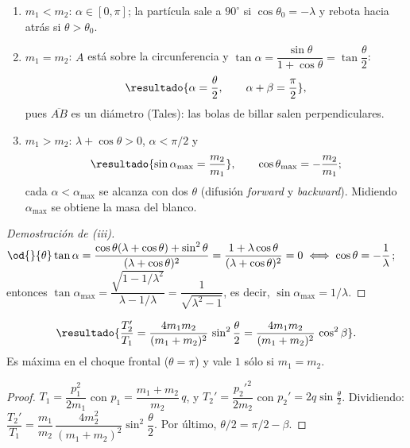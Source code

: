 \begin{corolario}
\label{cor:casos}
\begin{enumerate}[label=\textup{(\roman*)},leftmargin=2em]
  \item $m_{1}<m_{2}$: $\alpha\in[0,\pi]$; la partícula sale a $90^{\circ}$ si
        $\cos\theta_{0}=-\lambda$ y rebota hacia atrás si $\theta>\theta_{0}$.
  \item $m_{1}=m_{2}$: $A$ está sobre la circunferencia y $\tan\alpha=\dfrac{\sin\theta}{1+\cos\theta}=\tan\dfrac\theta2$:
        \[
          \resultado{\alpha=\frac\theta2,\qquad \alpha+\beta=\frac\pi2},
        \]
        pues $\overline{AB}$ es un diámetro (Tales): las bolas de billar salen perpendiculares.
  \item $m_{1}>m_{2}$: $\lambda+\cos\theta>0$, $\alpha<\pi/2$ y
        \[
          \resultado{\sin\alpha_{\max}=\frac{m_{2}}{m_{1}}},\qquad \cos\theta_{\max}=-\frac{m_{2}}{m_{1}};
        \]
        cada $\alpha<\alpha_{\max}$ se alcanza con dos $\theta$ (difusión \emph{forward} y \emph{backward}).
        Midiendo $\alpha_{\max}$ se obtiene la masa del blanco.
\end{enumerate}
\end{corolario}

\begin{proof}[Demostración de (iii)]
$\od{}{\theta}\tan\alpha=\dfrac{\cos\theta(\lambda+\cos\theta)+\sin^{2}\theta}{(\lambda+\cos\theta)^{2}}=\dfrac{1+\lambda\cos\theta}{(\lambda+\cos\theta)^{2}}=0
\iff\cos\theta=-\dfrac1\lambda$; entonces $\tan\alpha_{\max}=\dfrac{\sqrt{1-1/\lambda^{2}}}{\lambda-1/\lambda}=\dfrac{1}{\sqrt{\lambda^{2}-1}}$,
es decir, $\sin\alpha_{\max}=1/\lambda$.
\end{proof}

\begin{proposicion}
\label{prop:energia-cedida}
\begin{equation}
  \resultado{\frac{T_{2}'}{T_{1}}=\frac{4m_{1}m_{2}}{(m_{1}+m_{2})^{2}}\,\sin^{2}\frac\theta2
  =\frac{4m_{1}m_{2}}{(m_{1}+m_{2})^{2}}\,\cos^{2}\beta} .
  \label{eq:energia-cedida}
\end{equation}
Es máxima en el choque frontal ($\theta=\pi$) y vale $1$ sólo si $m_{1}=m_{2}$.
\end{proposicion}

\begin{proof}
$T_{1}=\dfrac{p_{1}^{2}}{2m_{1}}$ con $p_{1}=\dfrac{m_{1}+m_{2}}{m_{2}}\,q$, y $T_{2}'=\dfrac{p_{2}'^{2}}{2m_{2}}$ con
$p_{2}'=2q\sin\frac\theta2$. Dividiendo: $\dfrac{T_{2}'}{T_{1}}=\dfrac{m_{1}}{m_{2}}\,\dfrac{4m_{2}^{2}}{(m_{1}+m_{2})^{2}}\sin^{2}\dfrac\theta2$.
Por último, $\theta/2=\pi/2-\beta$.
\end{proof}

